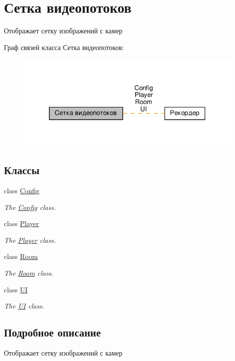 \hypertarget{group__grid}{}\section{Сетка видеопотоков}
\label{group__grid}


Отображает сетку изображений с камер  


Граф связей класса Сетка видеопотоков\+:\nopagebreak
\begin{figure}[H]
\begin{center}
\leavevmode
\includegraphics[width=320pt]{group__grid}
\end{center}
\end{figure}
\subsection*{Классы}
\begin{DoxyCompactItemize}
\item 
class \hyperlink{class_config}{Config}
\begin{DoxyCompactList}\small\item\em The \hyperlink{class_config}{Config} class. \end{DoxyCompactList}\item 
class \hyperlink{class_player}{Player}
\begin{DoxyCompactList}\small\item\em The \hyperlink{class_player}{Player} class. \end{DoxyCompactList}\item 
class \hyperlink{class_room}{Room}
\begin{DoxyCompactList}\small\item\em The \hyperlink{class_room}{Room} class. \end{DoxyCompactList}\item 
class \hyperlink{class_u_i}{UI}
\begin{DoxyCompactList}\small\item\em The \hyperlink{class_u_i}{UI} class. \end{DoxyCompactList}\end{DoxyCompactItemize}


\subsection{Подробное описание}
Отображает сетку изображений с камер 


